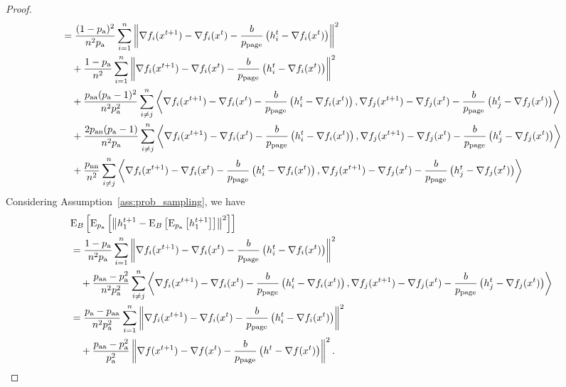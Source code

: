 \documentclass{article}
\newcommand*{\probavailable}{\ensuremath{p_{\textnormal{a}}}}
\newcommand*{\probpairaa}{\ensuremath{p_{\textnormal{aa}}}}
\newcommand*{\probpairan}{\ensuremath{p_{\textnormal{an}}}}
\newcommand*{\probpairnn}{\ensuremath{p_{\textnormal{nn}}}}
\newcommand*{\probpage}{\ensuremath{p_{\text{page}}}}
\begin{document}
\begin{proof}
\begin{align*}
    &=\frac{(1 - \probavailable)^2}{n^2 \probavailable}\sum_{i=1}^n\norm{\nabla f_i(x^{t+1}) - \nabla f_i(x^{t}) - \frac{b}{\probpage} \left(h^t_i - \nabla f_i(x^{t})\right)}^2 \\
    &\quad + \frac{1 - \probavailable}{n^2}\sum_{i=1}^n\norm{\nabla f_i(x^{t+1}) - \nabla f_i(x^{t}) - \frac{b}{\probpage} \left(h^t_i - \nabla f_i(x^{t})\right)}^2\\
    &\quad +\frac{\probpairaa(\probavailable - 1)^2}{n^2 \probavailable^2}\sum_{i\neq j}^n\inp{\nabla f_i(x^{t+1}) - \nabla f_i(x^{t}) - \frac{b}{\probpage} \left(h^t_i - \nabla f_i(x^{t})\right)}{\nabla f_j(x^{t+1}) - \nabla f_j(x^{t}) - \frac{b}{\probpage} \left(h^t_j - \nabla f_j(x^{t})\right)} \\
    &\quad +\frac{2\probpairan (\probavailable - 1)}{n^2 \probavailable}\sum_{i\neq j}^n\inp{\nabla f_i(x^{t+1}) - \nabla f_i(x^{t}) - \frac{b}{\probpage} \left(h^t_i - \nabla f_i(x^{t})\right)}{\nabla f_j(x^{t+1}) - \nabla f_j(x^{t}) - \frac{b}{\probpage} \left(h^t_j - \nabla f_j(x^{t})\right)} \\
    &\quad +\frac{\probpairnn}{n^2}\sum_{i\neq j}^n\inp{\nabla f_i(x^{t+1}) - \nabla f_i(x^{t}) - \frac{b}{\probpage} \left(h^t_i - \nabla f_i(x^{t})\right)}{\nabla f_j(x^{t+1}) - \nabla f_j(x^{t}) - \frac{b}{\probpage} \left(h^t_j - \nabla f_j(x^{t})\right)} \\
  \end{align*}
  Considering Assumption~\ref{ass:prob_sampling}, we have
  \begin{align*}
    &\ExpSub{B}{\ExpSub{\probavailable}{\norm{h^{t+1}_{1} - \ExpSub{B}{\ExpSub{\probavailable}{h^{t+1}_{1}}}}^2}}\\
    &=\frac{1 - \probavailable}{n^2 \probavailable}\sum_{i=1}^n\norm{\nabla f_i(x^{t+1}) - \nabla f_i(x^{t}) - \frac{b}{\probpage} \left(h^t_i - \nabla f_i(x^{t})\right)}^2 \\
    &\quad +\frac{\probpairaa - \probavailable^2}{n^2 \probavailable^2}\sum_{i\neq j}^n\inp{\nabla f_i(x^{t+1}) - \nabla f_i(x^{t}) - \frac{b}{\probpage} \left(h^t_i - \nabla f_i(x^{t})\right)}{\nabla f_j(x^{t+1}) - \nabla f_j(x^{t}) - \frac{b}{\probpage} \left(h^t_j - \nabla f_j(x^{t})\right)} \\
    &=\frac{\probavailable - \probpairaa}{n^2 \probavailable^2}\sum_{i=1}^n\norm{\nabla f_i(x^{t+1}) - \nabla f_i(x^{t}) - \frac{b}{\probpage} \left(h^t_i - \nabla f_i(x^{t})\right)}^2 \\
    &\quad +\frac{\probpairaa - \probavailable^2}{\probavailable^2}\norm{\nabla f(x^{t+1}) - \nabla f(x^{t}) - \frac{b}{\probpage} \left(h^t - \nabla f(x^{t})\right)}^2. \\

\end{align*}
\end{proof}
\end{document}
